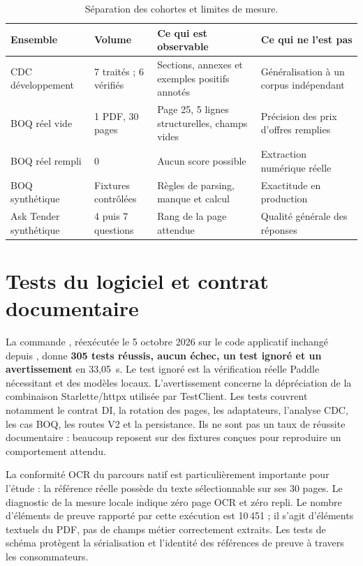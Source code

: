 \begin{table}[htbp]\centering\tighttable
\begin{tabularx}{\textwidth}{@{}p{31mm}p{22mm}Y Y@{}}\toprule
Ensemble & Volume & Ce qui est observable & Ce qui ne l'est pas\\\midrule
CDC développement & 7 traités ; 6 vérifiés & Sections, annexes et exemples positifs annotés & Généralisation à un corpus indépendant\\
BOQ réel vide & 1 PDF, 30 pages & Page 25, 5 lignes structurelles, champs vides & Précision des prix d'offres remplies\\
BOQ réel rempli & 0 & Aucun score possible & Extraction numérique réelle\\
BOQ synthétique & Fixtures contrôlées & Règles de parsing, manque et calcul & Exactitude en production\\
Ask Tender synthétique & 4 puis 7 questions & Rang de la page attendue & Qualité générale des réponses\\\bottomrule
\end{tabularx}
\caption{Séparation des cohortes et limites de mesure.}\label{tab:cohortes}
\end{table}

\section{Tests du logiciel et contrat documentaire}
La commande \texttt{}, réexécutée le 5 octobre 2026 sur le code applicatif inchangé depuis \texttt{}, donne \textbf{305 tests réussis, aucun échec, un test ignoré et un avertissement} en 33,05~s. Le test ignoré est la vérification réelle Paddle nécessitant \texttt{} et des modèles locaux. L'avertissement concerne la dépréciation de la combinaison Starlette/httpx utilisée par TestClient. Les tests couvrent notamment le contrat DI, la rotation des pages, les adaptateurs, l'analyse CDC, les cas BOQ, les routes V2 et la persistance. Ils ne sont pas un taux de réussite documentaire : beaucoup reposent sur des fixtures conçues pour reproduire un comportement attendu.

La conformité OCR du parcours natif est particulièrement importante pour l'étude : la référence réelle possède du texte sélectionnable sur ses 30 pages. Le diagnostic de la mesure locale indique zéro page OCR et zéro repli. Le nombre d'éléments de preuve rapporté par cette exécution est 10\,451 ; il s'agit d'éléments textuels du PDF, pas de champs métier correctement extraits. Les tests de schéma protègent la sérialisation \texttt{} et l'identité des références de preuve à travers les consommateurs.

